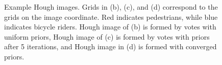 \begin{figure}
\centering
{}

\caption[Example Hough images]{Example Hough images. Grids in (b), (c), and (d) correspond to the grids on the image coordinate. Red indicates pedestrians, while blue indicates bicycle riders. Hough image of (b) is formed by votes with uniform priors, Hough image of (c) is formed by votes with priors after 5 iterations, and Hough image in (d) is formed with converged priors.}
\label{fig:Hough}
\end{figure}

